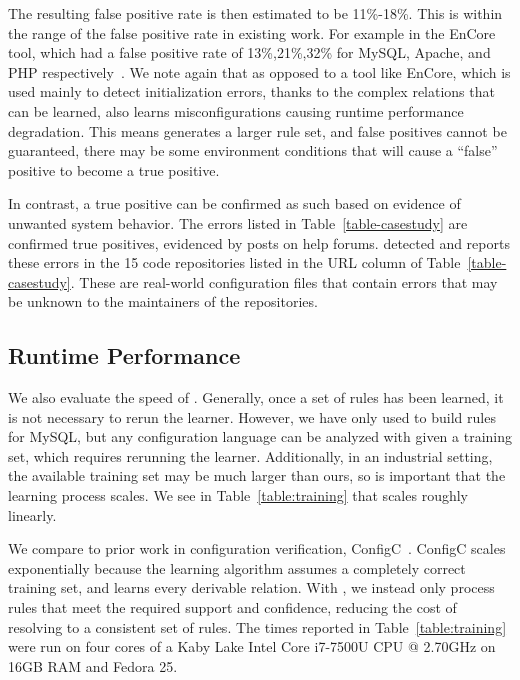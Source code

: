 The resulting false positive rate is then estimated to be 11\%-18\%.
This is within the range of the false positive rate in existing work.
For example in the EnCore tool, which had a false positive rate of 13\%,21\%,32\% for MySQL, Apache, and PHP respectively~\cite{encore}.
We note again that as opposed to a tool like EnCore, which is used mainly to detect initialization errors, thanks to the complex relations that can be learned, \app also learns misconfigurations causing runtime performance degradation.
This means \app generates a larger rule set, and false positives cannot be guaranteed, \ie there may be some environment conditions that will cause a ``false'' positive to become a true positive.

In contrast, a true positive can be confirmed as such based on evidence of unwanted system behavior.
The errors listed in Table~\ref{table-casestudy} are confirmed true positives, evidenced by posts on help forums.
\app detected and reports these errors in the 15 code repositories listed in the URL column of Table~\ref{table-casestudy}. 
These are real-world configuration files that contain errors that may be unknown to the maintainers of the repositories.

\subsection{Runtime Performance}
We also evaluate the speed of \app.
Generally, once a set of rules has been learned, it is not necessary to rerun the learner.
However, we have only used \app to build rules for MySQL, but any configuration language can be analyzed with \app given a training set, which requires rerunning the learner.
Additionally, in an industrial setting, the available training set may be much larger than ours, so is important that the learning process scales.
We see in Table~\ref{table:training} that \app scales roughly linearly.

We compare \app to prior work in configuration verification, ConfigC~\cite{santolucitoCAV}.
ConfigC scales exponentially because the learning algorithm assumes a completely correct training set, and learns every derivable relation.
With \app, we instead only process rules that meet the required support and confidence, reducing the cost of resolving to a consistent set of rules. 
The times reported in Table~\ref{table:training} were run on four cores of a Kaby Lake Intel Core i7-7500U CPU @ 2.70GHz on 16GB RAM and Fedora 25.

